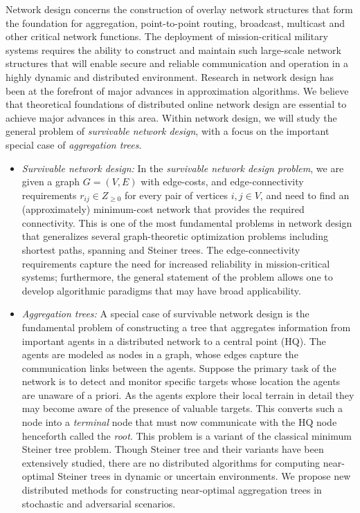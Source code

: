  Network design concerns the construction of
overlay network structures that form the foundation for aggregation,
point-to-point routing, broadcast, multicast and other critical
network functions.  The deployment of mission-critical military
systems requires the ability to construct and maintain such
large-scale network structures that will enable secure and reliable
communication and operation in a highly dynamic and distributed
environment.  Research in network design has been at the forefront of
major advances in approximation algorithms.  We believe that
theoretical foundations of distributed online network design are
essential to achieve major advances in this area.  Within network
design, we will study the general problem of {\em survivable network
  design}, with a focus on the important special case of {\em
  aggregation trees}.

\begin{itemize}
\item
{\sl Survivable network design:} In the {\em survivable network design
  problem}, we are given a graph $G = (V,E)$ with edge-costs, and
edge-connectivity requirements $r_{ij} \in Z_{\ge 0}$ for every pair
of vertices $i, j \in V$, and need to find an (approximately)
minimum-cost network that provides the required connectivity.  This is
one of the most fundamental problems in network design that
generalizes several graph-theoretic optimization problems including
shortest paths, spanning and Steiner trees.  The edge-connectivity
requirements capture the need for increased reliability in
mission-critical systems; furthermore, the general statement of the
problem allows one to develop algorithmic paradigms that may have
broad applicability.

\item
{\sl Aggregation trees:} A special case of survivable network design
is the fundamental problem of constructing a tree that aggregates
information from important agents in a distributed network to a
central point (HQ). The agents are modeled as nodes in a graph, whose
edges capture the communication links between the agents.  Suppose the
primary task of the network is to detect and monitor specific targets
whose location the agents are unaware of a priori.  As the agents
explore their local terrain in detail they may become aware of the
presence of valuable targets. This converts such a node into a {\em
  terminal} node that must now communicate with the HQ node henceforth
called the {\em root}.  This problem is a variant of the classical
minimum Steiner tree problem.  Though Steiner tree and their variants
have been extensively studied, there are no distributed algorithms for
computing near-optimal Steiner trees in dynamic or uncertain
environments.  We propose new distributed methods for constructing
near-optimal aggregation trees in stochastic and adversarial
scenarios.
\end{itemize}

